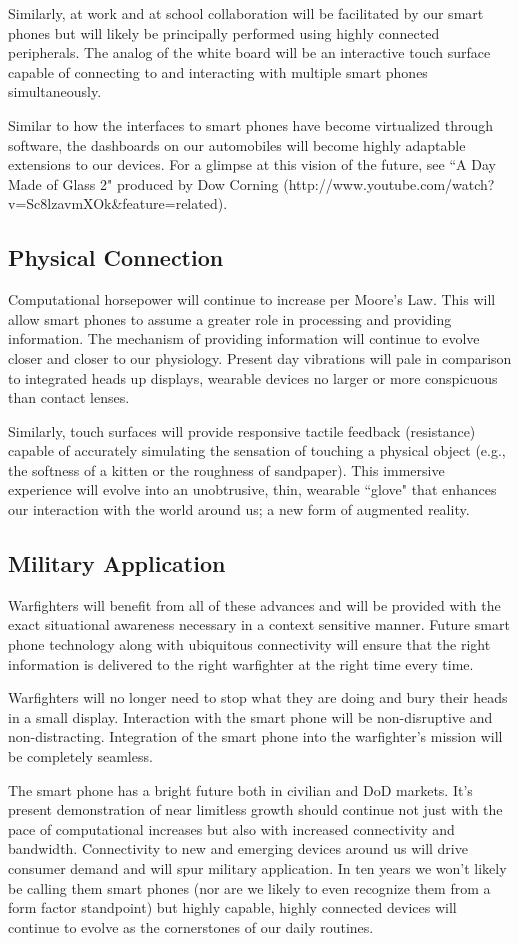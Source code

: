 \documentclass[letterpaper,12pt]{article}
\begin{document}
Similarly, at work and at school collaboration will be facilitated by our smart phones but will likely be principally performed using highly connected peripherals.  The analog of the white board will be an interactive touch surface capable of connecting to and interacting with multiple smart phones simultaneously.

Similar to how the interfaces to smart phones have become virtualized through software, the dashboards on our automobiles will become highly adaptable extensions to our devices.  For a glimpse at this vision of the future, see ``A Day Made of Glass 2" produced by Dow Corning (http://www.youtube.com/watch?v=Sc8lzavmXOk\&feature=related).

\subsection*{Physical Connection}
Computational horsepower will continue to increase per Moore's Law.  This will allow smart phones to assume a greater role in processing and providing information.  The mechanism of providing information will continue to evolve closer and closer to our physiology.  Present day vibrations will pale in comparison to integrated heads up displays, wearable devices no larger or more conspicuous than contact lenses.

Similarly, touch surfaces will provide responsive tactile feedback (resistance) capable of accurately simulating the sensation of touching a physical object (e.g., the softness of a kitten or the roughness of sandpaper).  This immersive experience will evolve into an unobtrusive, thin, wearable ``glove" that enhances our interaction with the world around us; a new form of augmented reality.

\subsection*{Military Application}
Warfighters will benefit from all of these advances and will be provided with the exact situational awareness necessary in a context sensitive manner.  Future smart phone technology along with ubiquitous connectivity will ensure that the right information is delivered to the right warfighter at the right time every time.

Warfighters will no longer need to stop what they are doing and bury their heads in a small display.  Interaction with the smart phone will be non-disruptive and non-distracting.  Integration of the smart phone into the warfighter's mission will be completely seamless.

The smart phone has a bright future both in civilian and DoD markets.  It's present demonstration of near limitless growth should continue not just with the pace of computational increases but also with increased connectivity and bandwidth.  Connectivity to new and emerging devices around us will drive consumer demand and will spur military application.  In ten years we won't likely be calling them smart phones (nor are we likely to even recognize them from a form factor standpoint) but highly capable, highly connected devices will continue to evolve as  the cornerstones of our daily routines.
\end{document}
